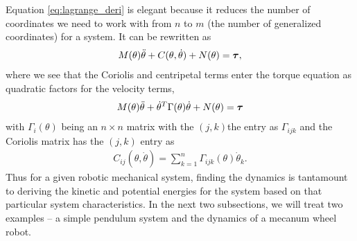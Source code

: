 %
Equation \eqref{eq:lagrange_deri} is elegant because it reduces the number of coordinates we need to work with from $n$ to $m$ (the number of generalized coordinates) for a system. It can be rewritten as 
% 
\begin{align}
M(\theta) \ddot{\theta} + C(\theta, \dot{\theta}) + N(\theta) = \bm{\tau},
\label{eq:lagrange_mat}
\end{align}
%
where we see that the Coriolis and centripetal terms enter the torque equation as quadratic factors for the velocity terms, \ie
%
\begin{align}
	M(\theta) \ddot{\theta} + \dot{\theta}^T \Gamma(\theta) \dot{\theta} + N(\theta) = \bm{\tau}
\end{align}
%
with $\Gamma_i(\theta)$ being an $n\times n$ matrix with the $(j,k)$the entry as $\Gamma_{ijk}$ and the Coriolis matrix has the $(j,k)$ entry as 
%
\begin{align}
	C_{ij}(\theta, \dot{\theta}) = \sum_{k=1}^{n} \Gamma_{ijk}(\theta) \dot{\theta}_k.
\end{align}
%
Thus for a given robotic mechanical system, finding the dynamics is tantamount to deriving the kinetic and potential energies for the system based on that particular system characteristics. In the next two subsections, we will treat two examples -- a simple pendulum system and the dynamics of a mecanum wheel robot. 

